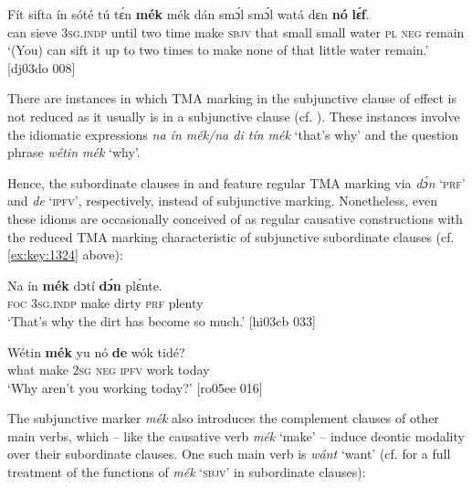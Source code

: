 \ea%
    \label{ex:key:1328}
    \gll Fít  sifta    ín    sóté    tú  tɛ́n    \textbf{mék}    mék
dán  smɔ́l  smɔ́l  watá  dɛn  \textbf{nó}  \textbf{lɛ́f}.\\
can  sieve  \textsc{3sg.indp}  until  two  time    make  \textsc{sbjv}
that  small  small  water  \textsc{pl}  \textsc{neg}  remain\\

\glt ‘(You) can sift it up to two times to make none of that little
water remain.’ [dj03do 008]
\z

There are instances in which TMA marking in the subjunctive clause of effect is not reduced as it usually is in a subjunctive clause (cf. ). These instances involve the idiomatic expressions \textit{na ín mék}\textit{\textup{/}}\textit{na di tín mék} ‘that’s why’ and the question phrase \textit{wétin mék} ‘why’.


Hence, the subordinate clauses in  and  feature regular TMA marking via \textit{dɔ́n} ‘\textsc{prf}’ and \textit{de} ‘\textsc{ipfv}’, respectively, instead of subjunctive marking. Nonetheless, even these idioms are occasionally conceived of as regular causative constructions with the reduced TMA marking characteristic of subjunctive subordinate clauses (cf. \ref{ex:key:1324} above):



\ea%
    \label{ex:key:1329}
    \gll Na  ín    \textbf{mék}    dɔtí    \textbf{dɔ́n}  plɛ́nte.\\
\textsc{foc}  \textsc{3sg.indp}  make  dirty  \textsc{prf}  plenty\\

\glt ‘That’s why the dirt has become so much.’ [hi03cb 033]
\z


\ea%
    \label{ex:key:1330}
    \gll Wétin  \textbf{mék}    yu  nó  \textbf{de}  wók    tidé?\\
what  make  \textsc{2sg}  \textsc{neg}  \textsc{ipfv}  work  today\\

\glt ‘Why aren’t you working today?’ [ro05ee 016]
\z

The subjunctive marker \textit{mék} also introduces the complement clauses of other main verbs, which – like the causative verb \textit{mék} ‘make’ – induce deontic modality over their subordinate clauses. One such main verb is \textit{wánt} ‘want’\textit{}  (cf.  for a full treatment of the functions of \textit{mék} ‘\textsc{sbjv’} in subordinate clauses): 


